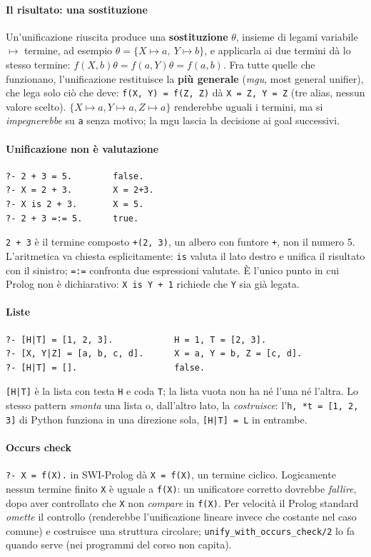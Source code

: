 \documentclass[a4paper,12pt]{article}
\begin{document}
\paragraph{Il risultato: una sostituzione} Un'unificazione riuscita produce una
\textbf{sostituzione} $\theta$, insieme di legami variabile $\mapsto$ termine, ad esempio
$\theta = \{X \mapsto a,\ Y \mapsto b\}$, e applicarla ai due termini dà lo stesso termine:
$f(X,b)\theta = f(a,Y)\theta = f(a,b)$. Fra tutte quelle che funzionano, l'unificazione restituisce
la \textbf{più generale} (\emph{mgu}, most general unifier), che lega solo ciò che deve:
\texttt{f(X, Y) = f(Z, Z)} dà \texttt{X = Z, Y = Z} (tre alias, nessun valore scelto).
$\{X \mapsto a, Y \mapsto a, Z \mapsto a\}$ renderebbe uguali i termini, ma si
\emph{impegnerebbe} su \texttt{a} senza motivo; la mgu lascia la decisione ai goal successivi.

\paragraph{Unificazione non è valutazione}
\begin{verbatim}
?- 2 + 3 = 5.        false.
?- X = 2 + 3.        X = 2+3.
?- X is 2 + 3.       X = 5.
?- 2 + 3 =:= 5.      true.
\end{verbatim}
\texttt{2 + 3} è il termine composto \texttt{+(2, 3)}, un albero con funtore \texttt{+}, non il
numero 5. L'aritmetica va chiesta esplicitamente: \texttt{is} valuta il lato destro e unifica il
risultato con il sinistro; \texttt{=:=} confronta due espressioni valutate. È l'unico punto in
cui Prolog non è dichiarativo: \texttt{X is Y + 1} richiede che \texttt{Y} sia già legata.

\paragraph{Liste}
\begin{verbatim}
?- [H|T] = [1, 2, 3].            H = 1, T = [2, 3].
?- [X, Y|Z] = [a, b, c, d].      X = a, Y = b, Z = [c, d].
?- [H|T] = [].                   false.
\end{verbatim}
\texttt{[H|T]} è la lista con testa \texttt{H} e coda \texttt{T}; la lista vuota non ha né
l'una né l'altra. Lo stesso pattern \emph{smonta} una lista o, dall'altro lato, la
\emph{costruisce}: l'\texttt{h, *t = [1, 2, 3]} di Python funziona in una direzione sola,
\texttt{[H|T] = L} in entrambe.

\paragraph{Occurs check} \texttt{?- X = f(X).} in SWI-Prolog dà \texttt{X = f(X)}, un termine
ciclico. Logicamente nessun termine finito \texttt{X} è uguale a \texttt{f(X)}: un unificatore
corretto dovrebbe \emph{fallire}, dopo aver controllato che \texttt{X} non \emph{compare} in
\texttt{f(X)}. Per velocità il Prolog standard \emph{omette} il controllo (renderebbe
l'unificazione lineare invece che costante nel caso comune) e costruisce una struttura circolare;
\texttt{unify\_with\_occurs\_check/2} lo fa quando serve (nei programmi del corso non capita).
\end{document}
